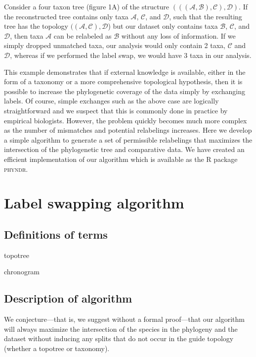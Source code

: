 \documentclass[a4paper,11pt]{article}
\begin{document}
Consider a four taxon tree (figure 1A) of the structure $(((\mathcal{A},\mathcal{B}),\mathcal{C}),\mathcal{D})$. If the reconstructed tree contains only taxa $\mathcal{A}$, $\mathcal{C}$, and $\mathcal{D}$, such that the resulting tree has the topology $((\mathcal{A},\mathcal{C}),\mathcal{D}$) but our dataset only contains taxa $\mathcal{B}$, $\mathcal{C}$, and $\mathcal{D}$, then taxa $\mathcal{A}$ can be relabeled as  $\mathcal{B}$  without any loss of information. If we simply dropped unmatched taxa, our analysis would only contain 2 taxa, $\mathcal{C}$ and $\mathcal{D}$, whereas if we performed the label swap, we would have 3 taxa in our analysis.

This example demonstrates that if external knowledge is available, either in the form of a taxonomy or a more comprehensive topological hypothesis, then it is possible to increase the phylogenetic coverage of the data simply by exchanging labels. Of course, simple exchanges such as the above case are logically straightforward and we suspect that this is commonly done in practice by empirical biologists. However, the problem quickly becomes much more complex as the number of mismatches and potential relabelings increases. Here we develop a simple algorithm to generate a set of permissible relabelings that maximizes the intersection of the phylogenetic tree and comparative data. We have created an efficient implementation of our algorithm which is available as the R package \textsc{phyndr}. 

\section{Label swapping algorithm}

\subsection{Definitions of terms}

topotree

chronogram

\subsection{Description of algorithm}

We conjecture---that is, we suggest without a formal proof---that our algorithm will always maximize the intersection of the species in the phylogeny and the dataset without inducing any splits that do not occur in the guide topology (whether a topotree or taxonomy).
\end{document}
